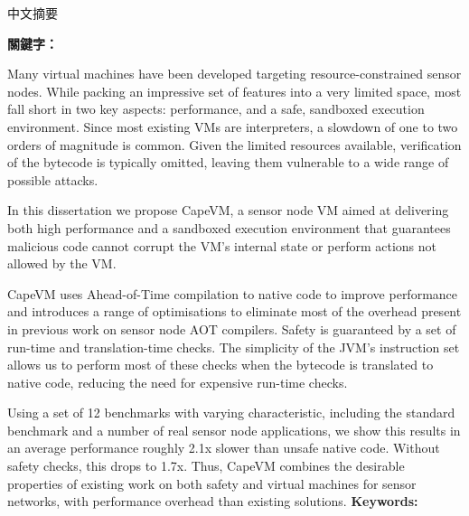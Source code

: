\begin{abstractzh}
中文摘要

\bigbreak
\noindent \textbf{關鍵字：}{\, \makeatletter \@keywordszh \makeatother}
\end{abstractzh}

\begin{abstracten}
Many virtual machines have been developed targeting resource-constrained sensor nodes. While packing an impressive set of features into a very limited space, most fall short in two key aspects: performance, and a safe, sandboxed execution environment. Since most existing VMs are interpreters, a slowdown of one to two orders of magnitude is common. Given the limited resources available, verification of the bytecode is typically omitted, leaving them vulnerable to a wide range of possible attacks.

In this dissertation we propose CapeVM, a sensor node VM aimed at delivering both high performance and a sandboxed execution environment that guarantees malicious code cannot corrupt the VM's internal state or perform actions not allowed by the VM.

CapeVM uses Ahead-of-Time compilation to native code to improve performance and introduces a range of optimisations to eliminate most of the overhead present in previous work on sensor node AOT compilers. Safety is guaranteed by a set of run-time and translation-time checks. The simplicity of the JVM's instruction set allows us to perform most of these checks when the bytecode is translated to native code, reducing the need for expensive run-time checks.

Using a set of 12 benchmarks with varying characteristic, including the standard  benchmark and a number of real sensor node applications, we show this results in an average performance roughly 2.1x slower than unsafe native code. Without safety checks, this drops to 1.7x. Thus, CapeVM combines the desirable properties of existing work on both safety and virtual machines for sensor networks, with performance overhead than existing solutions.
\bigbreak
\noindent \textbf{Keywords: }{\, \makeatletter \@keywordsen \makeatother}
\end{abstracten}

\begin{comment}


\end{comment}

